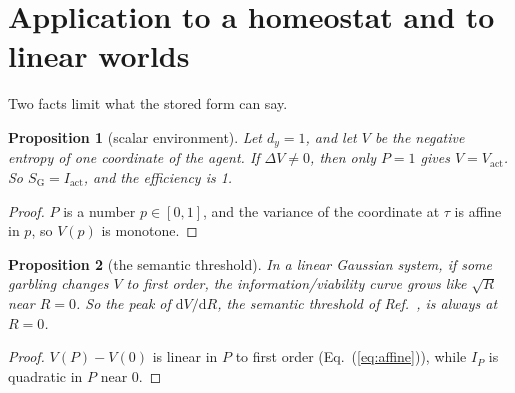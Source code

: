 \documentclass[11pt]{article}
\newtheorem{proposition}{Proposition}
\newcommand{\Vact}{V_{\mathrm{act}}}
\newcommand{\Iact}{I_{\mathrm{act}}}
\newcommand{\SG}{S_{\mathrm{G}}}
\begin{document}
\section{Application to a homeostat and to linear worlds}
\label{sec:apply}
Two facts limit what the stored form can say.

\begin{proposition}[scalar environment]\label{prop:F4}
Let $d_y=1$, and let $V$ be the negative entropy of one coordinate of the agent. If $\Delta V\ne0$, then only $P=1$
gives $V=\Vact$. So $\SG=\Iact$, and the efficiency is 1.
\end{proposition}
\begin{proof}
$P$ is a number $p\in[0,1]$, and the variance of the coordinate at $\tau$ is affine in $p$, so $V(p)$ is monotone.
\end{proof}

\begin{proposition}[the semantic threshold]\label{prop:F5}
In a linear Gaussian system, if some garbling changes $V$ to first order, the information/viability curve grows like
$\sqrt R$ near $R=0$. So the peak of $\mathrm{d}V/\mathrm{d}R$, the semantic threshold of Ref.~\cite{Sowinski23}, is
always at $R=0$.
\end{proposition}
\begin{proof}
$V(P)-V(0)$ is linear in $P$ to first order (Eq.~(\ref{eq:affine})), while $I_P$ is quadratic in $P$ near 0.
\end{proof}
\end{document}
